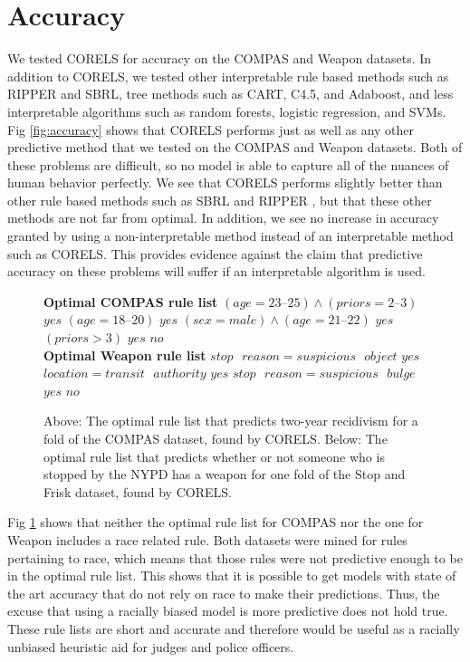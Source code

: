 \section{Accuracy}
We tested CORELS for accuracy on the COMPAS and Weapon datasets.
In addition to CORELS, we tested other interpretable rule based methods such as RIPPER and SBRL, tree methods such as CART, C4.5, and Adaboost, and less interpretable algorithms such as random forests, logistic regression, and SVMs.
Fig \ref{fig:accuracy} shows that CORELS performs just as well as any other predictive method that we tested on the COMPAS and Weapon datasets.
Both of these problems are difficult, so no model is able to capture all of the nuances of human behavior perfectly.
We see that CORELS performs slightly better than other rule based methods such as SBRL and RIPPER \cite{YangRuSe16}, but that these other methods are not far from optimal.
In addition, we see no increase in accuracy granted by using a non-interpretable method instead of an interpretable method such as CORELS.
This provides evidence against the claim that predictive accuracy on these problems will suffer if an interpretable algorithm is used.

\begin{figure}[t!]
\begin{algorithmic}
\normalsize
\State \textbf{Optimal COMPAS rule list}
\State \bif $(age=23\text{--}25) \wedge (priors=2\text{--}3)$ \bthen $yes$
\State \belif $(age=18\text{--}20)$ \bthen $yes$
\State \belif $(sex=male) \wedge (age=21\text{--}22)$ \bthen $yes$
\State \belif $(priors > 3)$ \bthen $yes$
\State \belse $no$\\

\State \textbf{Optimal Weapon rule list}
\State \bif $stop\text{ }reason=suspicious\text{ }object$ \bthen $yes$
\State \belif $location=transit\text{ }authority$ \bthen $yes$
\State \belif $stop\text{ }reason=suspicious\text{ }bulge$ \bthen $yes$
\State \belse $no$
\end{algorithmic}
\caption{Above: The optimal rule list that predicts two-year recidivism for a fold of the COMPAS dataset, found by CORELS.
Below: The optimal rule list that predicts whether or not someone who is stopped by the NYPD has a weapon for one fold of the Stop and Frisk dataset, found by CORELS.}
\label{fig:rule-list-optimal}
\end{figure}

Fig \ref{fig:rule-list-optimal} shows that neither the optimal rule list for COMPAS nor the one for Weapon includes a race related rule.
Both datasets were mined for rules pertaining to race, which means that those rules were not predictive enough to be in the optimal rule list.
This shows that it is possible to get models with state of the art accuracy that do not rely on race to make their predictions.
Thus, the excuse that using a racially biased model is more predictive does not hold true.
These rule lists are short and accurate and therefore would be useful as a racially unbiased heuristic aid for judges and police officers.

